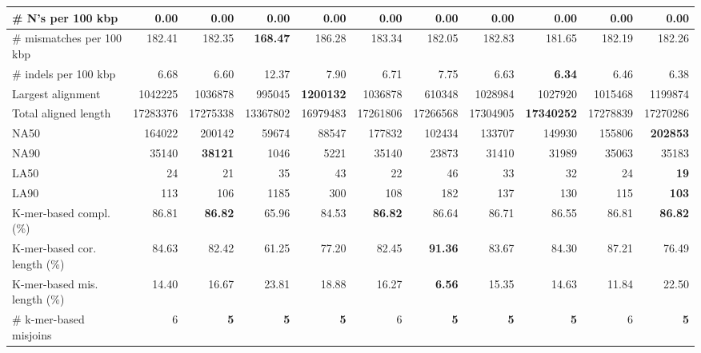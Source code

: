 \documentclass[12pt,a4paper]{article}
\begin{document}
\begin{table}[ht]
\begin{center}
\begin{tabular}{|l*{10}{|r}|}
\# N's per 100 kbp & 0.00 & 0.00 & 0.00 & 0.00 & 0.00 & 0.00 & 0.00 & 0.00 & 0.00 & 0.00 \\ \hline
\# mismatches per 100 kbp & 182.41 & 182.35 & {\bf 168.47} & 186.28 & 183.34 & 182.05 & 182.83 & 181.65 & 182.19 & 182.26 \\ \hline
\# indels per 100 kbp & 6.68 & 6.60 & 12.37 & 7.90 & 6.71 & 7.75 & 6.63 & {\bf 6.34} & 6.46 & 6.38 \\ \hline
Largest alignment & 1042225 & 1036878 & 995045 & {\bf 1200132} & 1036878 & 610348 & 1028984 & 1027920 & 1015468 & 1199874 \\ \hline
Total aligned length & 17283376 & 17275338 & 13367802 & 16979483 & 17261806 & 17266568 & 17304905 & {\bf 17340252} & 17278839 & 17270286 \\ \hline
NA50 & 164022 & 200142 & 59674 & 88547 & 177832 & 102434 & 133707 & 149930 & 155806 & {\bf 202853} \\ \hline
NA90 & 35140 & {\bf 38121} & 1046 & 5221 & 35140 & 23873 & 31410 & 31989 & 35063 & 35183 \\ \hline
LA50 & 24 & 21 & 35 & 43 & 22 & 46 & 33 & 32 & 24 & {\bf 19} \\ \hline
LA90 & 113 & 106 & 1185 & 300 & 108 & 182 & 137 & 130 & 115 & {\bf 103} \\ \hline
K-mer-based compl. (\%) & 86.81 & {\bf 86.82} & 65.96 & 84.53 & {\bf 86.82} & 86.64 & 86.71 & 86.55 & 86.81 & {\bf 86.82} \\ \hline
K-mer-based cor. length (\%) & 84.63 & 82.42 & 61.25 & 77.20 & 82.45 & {\bf 91.36} & 83.67 & 84.30 & 87.21 & 76.49 \\ \hline
K-mer-based mis. length (\%) & 14.40 & 16.67 & 23.81 & 18.88 & 16.27 & {\bf 6.56} & 15.35 & 14.63 & 11.84 & 22.50 \\ \hline
\# k-mer-based misjoins & 6 & {\bf 5} & {\bf 5} & {\bf 5} & 6 & {\bf 5} & {\bf 5} & {\bf 5} & 6 & {\bf 5} \\ \hline
\end{tabular}
\end{center}
\end{table}
\end{document}

